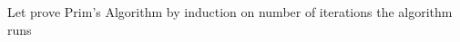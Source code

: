 \documentclass[preview]{standalone}
\begin{document}
\begin{center}
Let prove Prim's Algorithm by induction on number of iterations the algorithm runs
\end{center}
\end{document}

